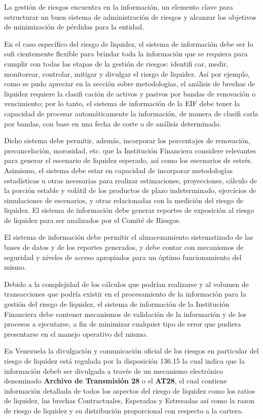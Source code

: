 \documentclass[]{article}
\begin{document}
La gestión de riesgos encuentra en la información, un elemento clave
para estructurar un buen sistema de administración de riesgos y alcanzar
los objetivos de minimización de pérdidas para la entidad.

En el caso específico del riesgo de liquidez, el sistema de información
debe ser lo sufi cientemente flexible para brindar toda la información
que se requiera para cumplir con todas las etapas de la gestión de
riesgos: identifi car, medir, monitorear, controlar, mitigar y divulgar
el riesgo de liquidez. Así por ejemplo, como se pudo apreciar en la
sección sobre metodologías, el análisis de brechas de liquidez requiere
la clasifi cación de activos y pasivos por bandas de renovación o
vencimiento; por lo tanto, el sistema de información de la EIF debe
tener la capacidad de procesar automáticamente la información, de manera
de clasifi carla por bandas, con base en una fecha de corte o de
análisis determinado.

Dicho sistema debe permitir, además, incorporar los porcentajes de
renovación, precancelación, morosidad, etc. que la Institución
Financiera considere relevantes para generar el escenario de liquidez
esperado, así como los escenarios de estrés. Asimismo, el sistema debe
estar en capacidad de incorporar metodologías estadísticas u otras
necesarias para realizar estimaciones, proyecciones, cálculo de la
porción estable y volátil de los productos de plazo indeterminado,
ejercicios de simulaciones de escenarios, y otras relacionadas con la
medición del riesgo de liquidez. El sistema de información debe generar
reportes de exposición al riesgo de liquidez para ser analizados por el
Comité de Riesgos.

El sistema de información debe permitir el almacenamiento sistematizado
de las bases de datos y de los reportes generados, y debe contar con
mecanismos de seguridad y niveles de acceso apropiados para un óptimo
funcionamiento del mismo.

Debido a la complejidad de los cálculos que podrían realizarse y al
volumen de transacciones que podría existir en el procesamiento de la
información para la gestión del riesgo de liquidez, el sistema de
información de la Institución Financiera debe contener mecanismos de
validación de la información y de los procesos a ejecutarse, a fin de
minimizar cualquier tipo de error que pudiera presentarse en el manejo
operativo del mismo.

En Venezuela la divulgación y comunicación oficial de los riesgos en
particular del riesgo de liquidez está regulada por la disposición
136.15 la cual indica que la información debeb ser divulgada a través de
un mecanismo electrónico denominado \textbf{Archivo de Transmisión 28} o
el \textbf{AT28}, el cual contiene información detallada de todos los
aspectos del riesgo de liquidez como los ratios de liquidez, las brechas
Contractuales, Esperadas y Estresadas así como la razon de riesgo de
liquidez y su distribución proporcional con respecto a la cartera.
\end{document}

